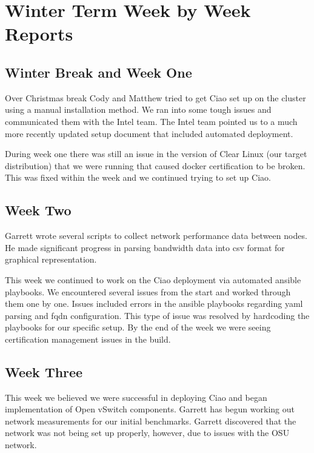 \documentclass[10pt,onecolumn,journal,draftclsnofoot]{IEEEtran}
\begin{document}
\section{Winter Term Week by Week Reports}

\subsection{Winter Break and Week One}

Over Christmas break Cody and Matthew tried to get Ciao set up on the cluster
using a manual installation method. We ran into some tough issues and
communicated them with the Intel team. The Intel team pointed us to a much more
recently updated setup document that included automated deployment.

During week one there was still an issue in the version of Clear Linux (our
target distribution) that we were running that caused docker certification to be
broken. This was fixed within the week and we continued trying to set up Ciao.

\subsection{Week Two}

Garrett wrote several scripts to collect network performance data between nodes.
He made significant progress in parsing bandwidth data into csv format for
graphical representation.

This week we continued to work on the Ciao deployment via automated ansible
playbooks. We encountered several issues from the start and worked through
them one by one. Issues included errors in the ansible playbooks regarding yaml
parsing and fqdn configuration. This type of issue was resolved by hardcoding
the playbooks for our specific setup. By the end of the week we were seeing
certification management issues in the build.

\subsection{Week Three}

This week we believed we were successful in deploying Ciao and began
implementation of Open vSwitch components. Garrett has begun working out network
measurements for our initial benchmarks. Garrett discovered that the network was
not being set up properly, however, due to issues with the OSU network.
\end{document}
